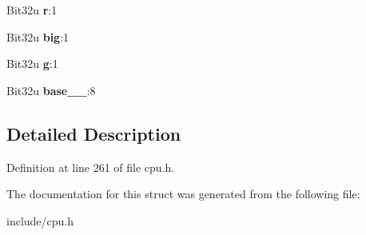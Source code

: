 \begin{DoxyCompactItemize}
\item 
\hypertarget{structS__Descriptor_ab85713407b929b2057bd5d270dd42c3b}{Bit32u {\bfseries r}\-:1}\label{structS__Descriptor_ab85713407b929b2057bd5d270dd42c3b}

\item 
\hypertarget{structS__Descriptor_a40a0bb2a57f2dee9120b8403e6f47a34}{Bit32u {\bfseries big}\-:1}\label{structS__Descriptor_a40a0bb2a57f2dee9120b8403e6f47a34}

\item 
\hypertarget{structS__Descriptor_a96e1d950804c1ae5592890f340a1fe97}{Bit32u {\bfseries g}\-:1}\label{structS__Descriptor_a96e1d950804c1ae5592890f340a1fe97}

\item 
\hypertarget{structS__Descriptor_a4056275d6cc2af40cd58a1cf0da07c1d}{Bit32u {\bfseries base\-\_\-\_}\-:8}\label{structS__Descriptor_a4056275d6cc2af40cd58a1cf0da07c1d}

\end{DoxyCompactItemize}


\subsection{Detailed Description}


Definition at line 261 of file cpu.\-h.



The documentation for this struct was generated from the following file\-:\begin{DoxyCompactItemize}
\item 
include/cpu.\-h\end{DoxyCompactItemize}
